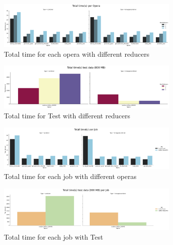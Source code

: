 \documentclass[a4paper, 12pt]{article}
\begin{document}
\begin{figure}[ht!]
  \centering
  \includegraphics[width=0.8\textwidth]{media/performance/total_time_S_per_opera.png}
  \caption{Total time for each opera with different reducers}
  \label{fig:TimeOperas}
\end{figure}

\begin{figure}[ht!]
  \centering
  \includegraphics[width=0.8\textwidth]{media/performance/total_time_S_per_opera(TEST).png}
  \caption{Total time for Test with different reducers}
  \label{fig:TimeTest}
\end{figure}

\begin{figure}[ht!]
  \centering
  \includegraphics[width=0.8\textwidth]{media/performance/total_time_S_per_job.png}
  \caption{Total time for each job with different operas}
  \label{fig:TimeJob}
\end{figure}

\begin{figure}[ht!]
  \centering
  \includegraphics[width=0.8\textwidth]{media/performance/total_time_S_per_job(TEST).png}
  \caption{Total time for each job with Test}
  \label{fig:TimeJobTest}
\end{figure}
\end{document}
